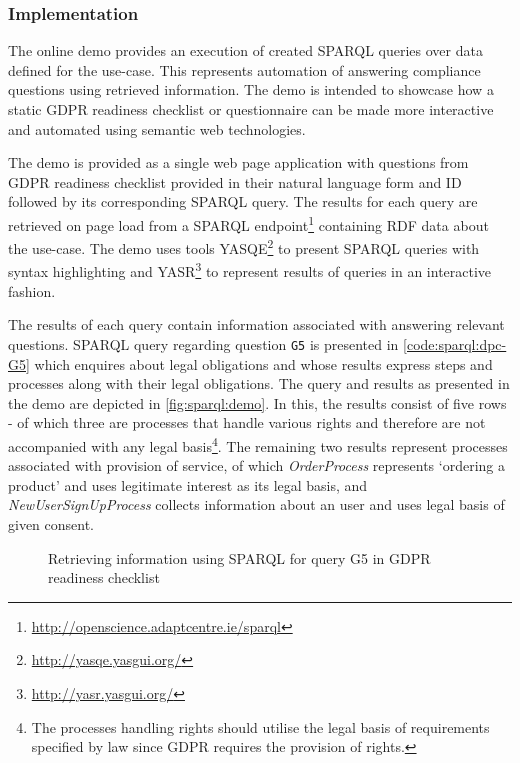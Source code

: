 \subsubsection{Implementation}
The online demo provides an execution of created SPARQL queries over data defined for the use-case.
This represents automation of answering compliance questions using retrieved information.
The demo is intended to showcase how a static GDPR readiness checklist or questionnaire can be made more interactive and automated using semantic web technologies.

The demo is provided as a single web page application with questions from GDPR readiness checklist provided in their natural language form and ID followed by its corresponding SPARQL query.
The results for each query are retrieved on page load from a
SPARQL endpoint\footnote{\url{http://openscience.adaptcentre.ie/sparql}}
containing RDF data about the use-case.
The demo uses tools YASQE\footnote{\url{http://yasqe.yasgui.org/}} to present SPARQL queries with syntax highlighting and YASR\footnote{\url{http://yasr.yasgui.org/}} to represent results of queries in an interactive fashion.

The results of each query contain information associated with answering relevant questions. SPARQL query regarding question \texttt{G5} is presented in \autoref{code:sparql:dpc-G5} which enquires about legal obligations and whose results express steps and processes along with their legal obligations.
The query and results as presented in the demo are depicted in \autoref{fig:sparql:demo}.
In this, the results consist of five rows - of which three are processes that handle various rights and therefore are not accompanied with any legal basis\footnote{The processes handling rights should utilise the legal basis of requirements specified by law since GDPR requires the provision of rights.}.
The remaining two results represent processes associated with provision of service, of which \textit{OrderProcess} represents `ordering a product' and uses legitimate interest as its legal basis, and \textit{NewUserSignUpProcess} collects information about an user and uses legal basis of given consent.
\begin{figure}[htbp]
\centering
{}
\caption{Retrieving information using SPARQL for query G5 in GDPR readiness checklist}
\label{fig:sparql:demo}
\end{figure}

